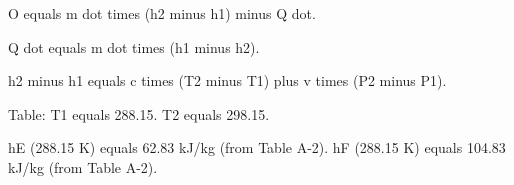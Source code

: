 O equals m dot times (h2 minus h1) minus Q dot.  

Q dot equals m dot times (h1 minus h2).  

h2 minus h1 equals c times (T2 minus T1) plus v times (P2 minus P1).  

Table:  
T1 equals 288.15.  
T2 equals 298.15.  

hE (288.15 K) equals 62.83 kJ/kg (from Table A-2).  
hF (288.15 K) equals 104.83 kJ/kg (from Table A-2).